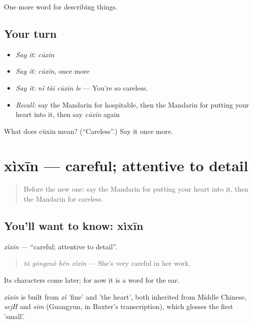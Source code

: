 \begin{grammarlens}[title={What you've built}]
One more word for describing things.
\end{grammarlens}

\subsection*{Your turn}
\begin{itemize}
\raggedright
  \item \emph{Say it:} \emph{cūxīn}
  \item \emph{Say it:} \emph{cūxīn}, once more
  \item \emph{Say it:} \emph{nǐ tài cūxīn le} — You're so careless.
  \item \emph{Recall:} say the Mandarin for hospitable, then the Mandarin for putting your heart into it, then say \emph{cūxīn} again
\end{itemize}

\begin{tcolorbox}[breakable,colback=teal!4,colframe=teal!35!black,title={Before you move on}]
What does cūxīn mean? (\textquotedblleft{}Careless\textquotedblright{}.) Say it once more.
\end{tcolorbox}
\section[xìxīn]{xìxīn — careful; attentive to detail}

\label{lesson:ZH-C273-xixin}



\begin{quote}
Before the new one: say the Mandarin for putting your heart into it, then the Mandarin for careless.
\end{quote}

\subsection*{You'll want to know: xìxīn}
\emph{xìxīn} — \textquotedblleft{}careful; attentive to detail\textquotedblright{}.

\begin{quote}
\emph{tā gōngzuò hěn xìxīn} — She's very careful in her work.
\end{quote}

Its characters come later; for now it is a word for the ear.

\begin{cousinweb}
\emph{xìxīn} is built from \emph{xì} 'fine' and  'the heart', both inherited from Middle Chinese, \emph{sejH} and \emph{sim} (Guangyun, in Baxter's transcription), which glosses the first 'small'.
\end{cousinweb}

